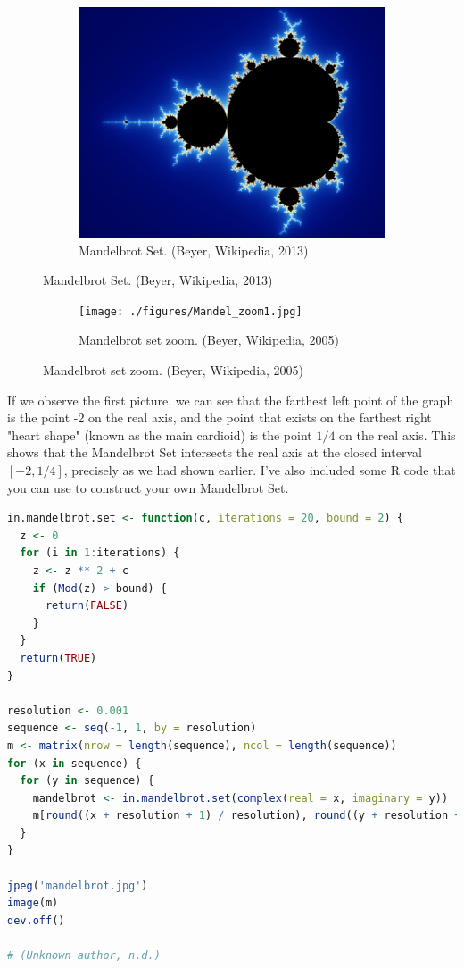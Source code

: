 \documentclass[20pt]{article} %
\begin{document}
\begin{figure}[!htbp]
  	\centering
   	\begin{subfigure}[p]{0.6\linewidth}
    	\includegraphics[width=\linewidth]{./figures/Mandel_zoom.jpg}
	\caption{Mandelbrot Set. (Beyer, Wikipedia, 2013)}
   	\end{subfigure}
\end{figure}

\begin{figure}[!htbp]
  	\centering
   	\begin{subfigure}[]{0.6\linewidth}
    	\texttt{[image: ./figures/Mandel\_zoom1.jpg]}
	\caption{Mandelbrot set zoom. (Beyer, Wikipedia, 2005)}
   	\end{subfigure}
\end{figure}
\newpage

If we observe the first picture, we can see that the farthest left point of the graph is the point -2 on the real axis, and the point that exists on the farthest right "heart shape" (known as the main cardioid) is the point $1/4$ on the real axis. This shows that the Mandelbrot Set intersects the real axis at the closed interval $[-2, 1/4]$, precisely as we had shown earlier.  
I've also included some R code that you can use to construct your own Mandelbrot Set.  

\begin{lstlisting}[language=R]
in.mandelbrot.set <- function(c, iterations = 20, bound = 2) {
  z <- 0
  for (i in 1:iterations) {
    z <- z ** 2 + c
    if (Mod(z) > bound) {
      return(FALSE)
    }
  }
  return(TRUE)
}

resolution <- 0.001
sequence <- seq(-1, 1, by = resolution)
m <- matrix(nrow = length(sequence), ncol = length(sequence))
for (x in sequence) {
  for (y in sequence) {
    mandelbrot <- in.mandelbrot.set(complex(real = x, imaginary = y))
    m[round((x + resolution + 1) / resolution), round((y + resolution + 1) / resolution)] <- mandelbrot
  }
}

jpeg('mandelbrot.jpg')
image(m)
dev.off()

# (Unknown author, n.d.)
\end{lstlisting}
\end{document}
